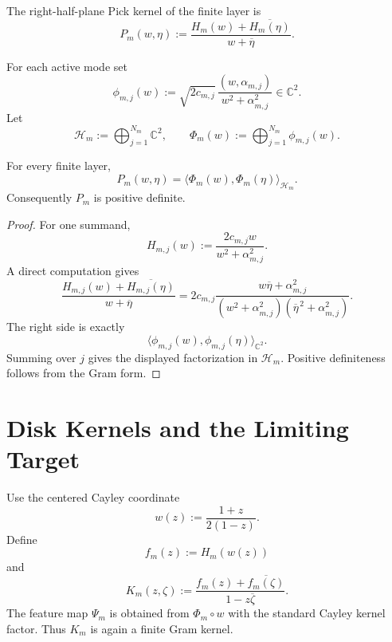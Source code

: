 \begin{definition}
\label{def:rh-finite-right-half-plane-pick-kernel}
The right-half-plane Pick kernel of the finite layer is
$$
P_m(w,\eta)
:=
\frac{H_m(w)+\overline{H_m(\eta)}}{w+\overline{\eta}}.
$$
\end{definition}

\begin{definition}
\label{def:rh-finite-hilbert-feature-map}
For each active mode set
$$
\phi_{m,j}(w)
:=
\sqrt{2c_{m,j}}\,
\frac{(w,\alpha_{m,j})}{w^2+\alpha_{m,j}^2}
\in\mathbb C^2.
$$
Let
$$
\mathcal H_m
:=
\bigoplus_{j=1}^{N_m}\mathbb C^2,
\qquad
\Phi_m(w)
:=
\bigoplus_{j=1}^{N_m}\phi_{m,j}(w).
$$
\end{definition}

\begin{theorem}
\label{thm:rh-finite-pick-kernel-hilbert-factorization}
For every finite layer,
$$
P_m(w,\eta)
=
\langle\Phi_m(w),\Phi_m(\eta)\rangle_{\mathcal H_m}.
$$
Consequently $P_m$ is positive definite.
\end{theorem}

\begin{proof}
For one summand,
$$
H_{m,j}(w)
:=
\frac{2c_{m,j}w}{w^2+\alpha_{m,j}^2}.
$$
A direct computation gives
$$
\frac{H_{m,j}(w)+\overline{H_{m,j}(\eta)}}{w+\overline{\eta}}
=
2c_{m,j}
\frac{w\overline{\eta}+\alpha_{m,j}^2}
{(w^2+\alpha_{m,j}^2)(\overline{\eta}^{\,2}+\alpha_{m,j}^2)}.
$$
The right side is exactly
$$
\langle\phi_{m,j}(w),\phi_{m,j}(\eta)\rangle_{\mathbb C^2}.
$$
Summing over $j$ gives the displayed factorization in $\mathcal H_m$.
Positive definiteness follows from the Gram form.
\end{proof}

\section{Disk Kernels and the Limiting Target}
\label{sec:rh-triadic-solenoid-disk-kernel}

\begin{definition}
\label{def:rh-finite-disk-pick-kernel}
Use the centered Cayley coordinate
$$
w(z):=\frac{1+z}{2(1-z)}.
$$
Define
$$
f_m(z):=H_m(w(z))
$$
and
$$
K_m(z,\zeta)
:=
\frac{f_m(z)+\overline{f_m(\zeta)}}{1-z\overline{\zeta}}.
$$
The feature map $\Psi_m$ is obtained from $\Phi_m\circ w$ with the
standard Cayley kernel factor. Thus $K_m$ is again a finite Gram kernel.
\end{definition}

